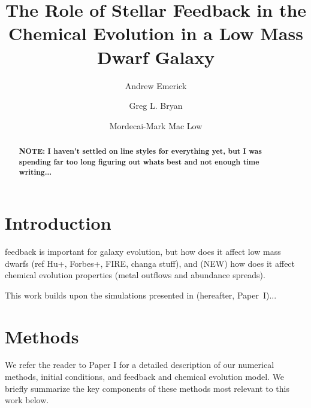 \documentclass[twocolumn]{aastex62}
\begin{document}
\title{The Role of Stellar Feedback in the Chemical Evolution in a Low Mass Dwarf Galaxy}


\author[0000-0003-2807-328X]{Andrew Emerick}
\author[0000-0003-2630-9228]{Greg L. Bryan}
\author[0000-0003-0064-4060]{Mordecai-Mark Mac Low}




\begin{abstract}
\textbf{NOTE: I haven't settled on line styles for everything yet, but I was spending far too long figuring out whats best and not enough time writing...}
\end{abstract}

\section{Introduction}
feedback is important for galaxy evolution, but how does it affect low mass dwarfs (ref Hu+, Forbes+, FIRE, changa stuff), and (NEW) how does it affect chemical evolution properties (metal outflows and abundance spreads).

This work builds upon the simulations presented in \citet{Emerick2019} (hereafter, Paper~I)...

\section{Methods} 
\label{sec:methods}
We refer the reader to Paper I for a detailed description of our numerical methods, initial conditions, and feedback and chemical evolution model. We briefly summarize the key components of these methods most relevant to this work below. 
\end{document}
